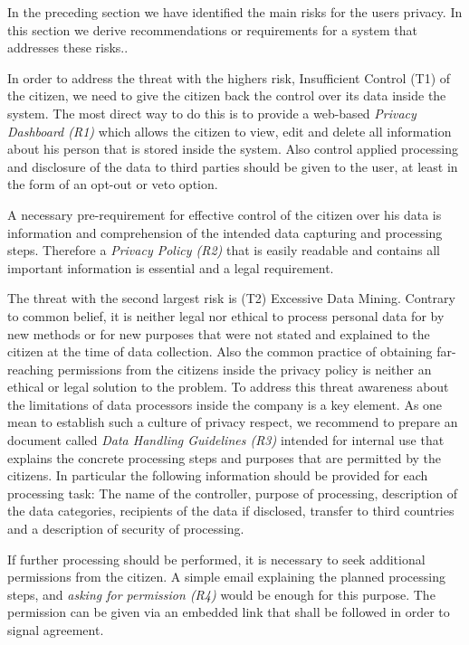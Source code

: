 \documentclass[runningheads,a4paper]{llncs}
\begin{document}
In the preceding section we have identified the main risks for the
users privacy.  In this section we derive recommendations or
requirements for a system that addresses these risks..

In order to address the threat with the highers risk, Insufficient
Control (T1) of the citizen, we need to give the citizen back the
control over its data inside the system. The most direct way to do
this is to provide a web-based \emph{Privacy Dashboard (R1)} which allows
the citizen to view, edit and delete all information about his person
that is stored inside the system. Also control applied processing and
disclosure of the data to third parties should be given to the user,
at least in the form of an opt-out or veto option.

A necessary pre-requirement for effective control of the citizen over
his data is information and comprehension of the intended data
capturing and processing steps. Therefore a \emph{Privacy Policy (R2)} that
is easily readable and contains all important information is
essential and a legal requirement.

The threat with the second largest risk is (T2) Excessive Data Mining.
Contrary to common belief, it is neither legal nor ethical to process
personal data for by new methods or for new purposes that were not
stated and explained to the citizen at the time of data
collection. Also the common practice of obtaining far-reaching
permissions from the citizens inside the privacy policy is neither an
ethical or legal solution to the problem. To address this threat awareness about the limitations of data
processors inside the company is a key element. As one mean to
establish such a culture of privacy respect, we recommend to prepare
an document called \emph{Data Handling Guidelines (R3)} intended for
internal use that explains the concrete processing steps and purposes
that are permitted by the citizens. In particular the following information should be provided for each processing task: The name of the controller, purpose of processing,
description of the data categories, recipients of the data if
disclosed, transfer to third countries and a description of security
of processing.

If further processing should be performed, it is necessary to seek
additional permissions from the citizen. A simple email explaining the
planned processing steps, and \emph{asking for permission (R4)} would be
enough for this purpose. The permission can be given via an embedded
link that shall be followed in order to signal agreement.
\end{document}
